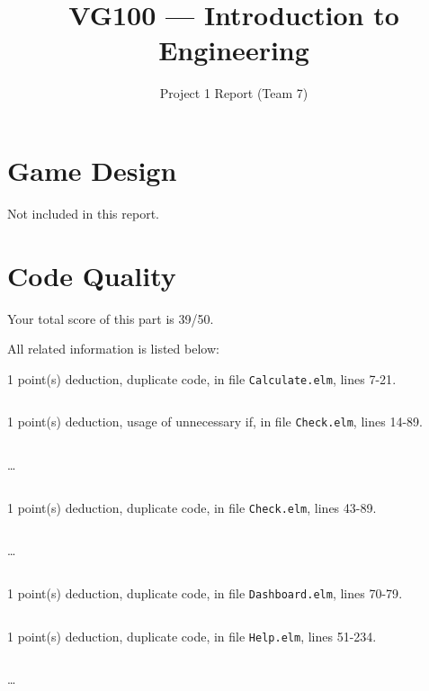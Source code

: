 \documentclass{article}
\title{VG100 --- Introduction to\\ Engineering}
\subtitle{Project 1 Report (Team 7)}
\begin{document}
\maketitle

\section{Game Design}

Not included in this report.

\section{Code Quality}

Your total score of this part is 39/50. \medskip

All related information is listed below: \medskip

1 point(s) {\color{red}deduction}, duplicate code, in file {\color{blue}\texttt{Calculate.elm}}, lines {\color{blue}7-21}.

\inputminted[firstline=7,lastline=21]{elm}{Calculate.elm}

1 point(s) {\color{red}deduction}, usage of unnecessary if, in file {\color{blue}\texttt{Check.elm}}, lines {\color{blue}14-89}.

\inputminted[firstline=14,lastline=23]{elm}{Check.elm}

\dots

\inputminted[firstline=80,lastline=89]{elm}{Check.elm}

1 point(s) {\color{red}deduction}, duplicate code, in file {\color{blue}\texttt{Check.elm}}, lines {\color{blue}43-89}.

\inputminted[firstline=43,lastline=52]{elm}{Check.elm}

\dots

\inputminted[firstline=80,lastline=89]{elm}{Check.elm}

1 point(s) {\color{red}deduction}, duplicate code, in file {\color{blue}\texttt{Dashboard.elm}}, lines {\color{blue}70-79}.

\inputminted[firstline=70,lastline=79]{elm}{Dashboard.elm}

1 point(s) {\color{red}deduction}, duplicate code, in file {\color{blue}\texttt{Help.elm}}, lines {\color{blue}51-234}.

\inputminted[firstline=51,lastline=60]{elm}{Help.elm}

\dots

\inputminted[firstline=225,lastline=234]{elm}{Help.elm}
\end{document}
